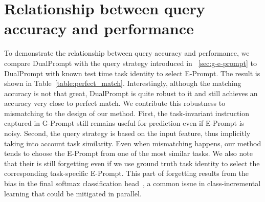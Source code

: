 \documentclass[runningheads]{llncs}
\newcommand{\method}{DualPrompt\xspace}
\newcommand{\gprompt}{G-Prompt\xspace}
\newcommand{\eprompt}{E-Prompt\xspace}
\begin{document}
\section{Relationship between query accuracy and performance} \label{app:perfect_match}
To demonstrate the relationship between query accuracy and performance, we compare \method with the query strategy introduced in ~\ref{sec:g-e-prompt} to \method with known test time task identity to select \eprompt. The result is shown in Table~\ref{table:perfect_match}. 
Interestingly, although the matching accuracy is not that great, \method is quite robust to it and still achieves an accuracy very close to perfect match. We contribute this robustness to mismatching to the design of our method. First, the task-invariant instruction captured in \gprompt still remains useful for prediction even if \eprompt is noisy. Second, the query strategy is based on the input feature, thus implicitly taking into account task similarity. Even when mismatching happens, our method tends to choose the \eprompt from one of the most similar tasks. We also note that their is still forgetting even if we use ground truth task identity to select the corresponding task-specific \eprompt. This part of forgetting results from the bias in the final softmax classification head~\cite{mai2021online,prabhu2020gdumb,zeno2018task}, a common issue in class-incremental learning that could be mitigated in parallel.
\end{document}
